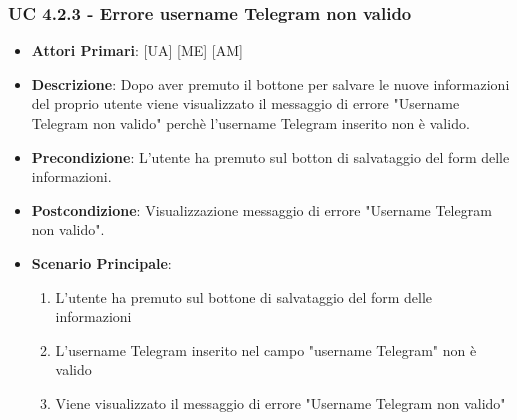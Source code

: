 			\subsubsection{UC 4.2.3 - Errore username Telegram non valido}
			\begin{itemize}
				\item \textbf{Attori Primari}: [UA] [ME] [AM]
				\item \textbf{Descrizione}: Dopo aver premuto il bottone per salvare le nuove informazioni del proprio utente viene visualizzato il messaggio di errore "Username Telegram non valido" perchè l'username Telegram inserito non è valido. 
				\item \textbf{Precondizione}: L'utente ha premuto sul botton di salvataggio del form delle informazioni.
				\item \textbf{Postcondizione}: Visualizzazione messaggio di errore "Username Telegram non valido".
				\item \textbf{Scenario Principale}:
				\begin{enumerate}
					\item{L'utente ha premuto sul bottone di salvataggio del form delle informazioni}
					\item{L'username Telegram inserito nel campo "username Telegram" non è valido}
					\item{Viene visualizzato il messaggio di errore "Username Telegram non valido"}
				\end{enumerate}	
			\end{itemize}